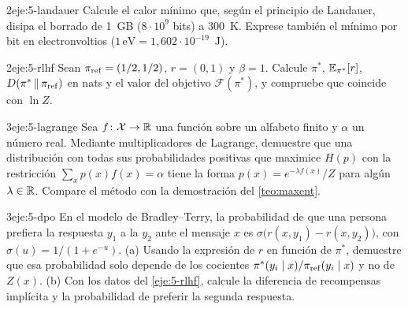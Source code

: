 \begin{ejercicio}{2}{eje:5-landauer}
Calcule el calor mínimo que, según el principio de Landauer, disipa el borrado de 1~GB ($8\cdot10^{9}$ bits) a $300$~K. Exprese también el mínimo por bit en electronvoltios ($1\,\mathrm{eV}=1{,}602\cdot10^{-19}$~J).
\end{ejercicio}

\begin{ejercicio}{2}{eje:5-rlhf}
Sean $\pi_{\mathrm{ref}}=(1/2,1/2)$, $r=(0,1)$ y $\beta=1$. Calcule $\pi^{*}$, $\mathbb{E}_{\pi^{*}}[r]$, $D(\pi^{*}\,\|\,\pi_{\mathrm{ref}})$ en nats y el valor del objetivo $\mathcal{F}(\pi^{*})$, y compruebe que coincide con $\ln Z$.
\end{ejercicio}

\begin{ejercicio}{3}{eje:5-lagrange}
Sea $f\colon\mathcal{X}\to\mathbb{R}$ una función sobre un alfabeto finito y $\alpha$ un número real. Mediante multiplicadores de Lagrange, demuestre que una distribución con todas sus probabilidades positivas que maximice $H(p)$ con la restricción $\sum_xp(x)f(x)=\alpha$ tiene la forma $p(x)=e^{-\lambda f(x)}/Z$ para algún $\lambda\in\mathbb{R}$. Compare el método con la demostración del \cref{teo:maxent}.
\end{ejercicio}

\begin{ejercicio}{3}{eje:5-dpo}
En el modelo de Bradley--Terry, la probabilidad de que una persona prefiera la respuesta $y_1$ a la $y_2$ ante el mensaje $x$ es $\sigma\bigl(r(x,y_1)-r(x,y_2)\bigr)$, con $\sigma(u)=1/(1+e^{-u})$. (a) Usando la expresión de $r$ en función de $\pi^{*}$, demuestre que esa probabilidad solo depende de los cocientes $\pi^{*}(y_i\mid x)/\pi_{\mathrm{ref}}(y_i\mid x)$ y no de $Z(x)$. (b) Con los datos del \cref{eje:5-rlhf}, calcule la diferencia de recompensas implícita y la probabilidad de preferir la segunda respuesta.
\end{ejercicio}
